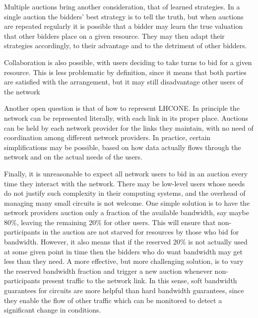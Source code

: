 Multiple auctions bring another consideration, that of learned strategies. In a single auction the bidders' best strategy is to tell the truth, but when auctions are repeated regularly it is possible that a bidder may learn the true valuation that other bidders place on a given resource. They may then adapt their strategies accordingly, to their advantage and to the detriment of other bidders. 

Collaboration is also possible, with users deciding to take turns to bid for a given resource. This is less problematic by definition, since it means that both parties are satisfied with the arrangement, but it may still disadvantage other users of the network

Another open question is that of how to represent LHCONE. In principle the network can be represented literally, with each link in its proper place. Auctions can be held by each network provider for the links they maintain, with no need of coordination among different network providers. In practice, certain simplifications may be possible, based on how data actually flows through the network and on the actual needs of the users.

Finally, it is unreasonable to expect all network users to bid in an auction every time they interact with the network. There may be low-level users whose needs do not justify such complexity in their computing systems, and the overhead of managing many small circuits is not welcome. One simple solution is to have the network providers auction only a fraction of the available bandwidth, say maybe 80\%, leaving the remaining 20\% for other users. This will ensure that non-participants in the auction are not starved for resources by those who bid for bandwidth. However, it also means that if the reserved 20\% is not actually used at some given point in time then the bidders who do want bandwidth may get less than they need. A more effective, but more challenging solution, is to vary the reserved bandwidth fraction and trigger a new auction whenever non-participants present traffic to the network link. In this sense, soft bandwidth guarantees for circuits are more helpful than hard bandwidth guarantees, since they enable the flow of other traffic which can be monitored to detect a significant change in conditions.
